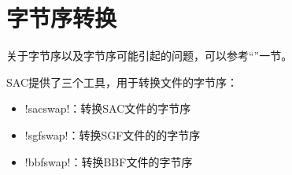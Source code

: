 \section{字节序转换}
\label{sec:bbfswap}
\label{sec:sacswap}
\label{sec:sgfswap}

关于字节序以及字节序可能引起的问题，可以参考``''一节。

SAC提供了三个工具，用于转换文件的字节序：
\begin{itemize}
\item !sacswap!：转换SAC文件的字节序
\item !sgfswap!：转换SGF文件的的字节序
\item !bbfswap!：转换BBF文件的字节序
\end{itemize}